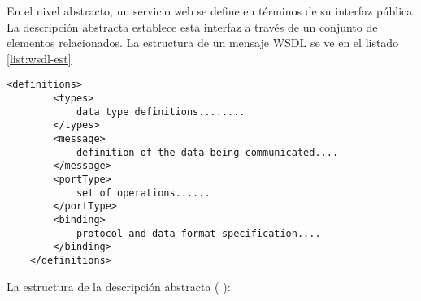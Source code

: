  
 En el nivel abstracto, un servicio web se define en términos de su interfaz pública. La descripci\'on  abstracta establece esta interfaz a través de un conjunto de elementos relacionados.
  La estructura de un mensaje WSDL se ve en el listado \ref{list:wsdl-est} 
 
 \begin{lstlisting}[label=list:wsdl-est, caption=Estructura de mensaje WSDL]
 	<definitions>
 		<types>
 			data type definitions........
 		</types>
 		<message>
 			definition of the data being communicated....
 		</message>
 		<portType>
 			set of operations......
 		</portType>
 		<binding>
 			protocol and data format specification....
 		</binding> 
 	</definitions> 
 \end{lstlisting}
 
 
 La estructura de la descripción abstracta ( ):
